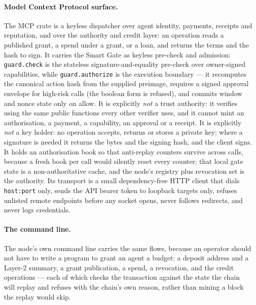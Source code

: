 \documentclass{article}
\begin{document}
\paragraph{Model Context Protocol surface.} The MCP crate is a keyless
dispatcher over agent identity, payments, receipts and reputation, and over the
authority and credit layer: an operation reads a published grant, a spend under
a grant, or a loan, and returns the terms and the hash to sign. It carries
the Smart Gate as keyless pre-check and admission: \texttt{guard.check} is the
stateless signature-and-equality pre-check over owner-signed capabilities,
while \texttt{guard.authorize} is the execution boundary --- it recomputes the
canonical action hash from the supplied preimage, requires a signed approval
envelope for high-risk calls (the boolean form is refused), and commits window
and nonce state only on allow. It is explicitly \emph{not} a trust authority:
it verifies using the same public functions every other verifier uses, and it
cannot mint an authorisation, a payment, a capability, an approval or a
receipt. It is explicitly \emph{not} a key holder: no operation accepts,
returns or stores a private key; where a signature is needed it returns the
bytes and the signing hash, and the client signs. It holds an authorisation
book so that anti-replay counters survive across calls, because a fresh book
per call would silently reset every counter; that local gate state is a
non-authoritative cache, and the node's registry plus revocation set is the
authority. Its transport is a small dependency-free HTTP client that dials
\texttt{host:port} only, sends the API bearer token to loopback targets only,
refuses unlisted remote endpoints before any socket opens, never follows
redirects, and never logs credentials.

\paragraph{The command line.} The node's own command line carries the same
flows, because an operator should not have to write a program to grant an
agent a budget: a deposit address and a Layer-2 summary, a grant publication,
a spend, a revocation, and the credit operations --- each of which checks the
transaction against the state the chain will replay and refuses with the
chain's own reason, rather than mining a block the replay would skip.
\end{document}
